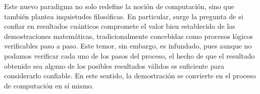 \documentclass[twoside, digital, 11pt]{fc-hw-template}
\begin{document}
Este nuevo paradigma no solo redefine la noción de computación, sino que también plantea inquietudes filosóficas. En particular, surge la pregunta de si confiar en resultados cuánticos compromete el valor bien establecido de las demostraciones matemáticas, tradicionalmente concebidas como procesos lógicos verificables paso a paso. Este temor, sin embargo, es infundado, pues aunque no podamos verificar cada uno de los pasos del proceso, el hecho de que el resultado obtenido sea alguno de los posibles resultados válidos es suficiente para considerarlo confiable. En este sentido, la demostración se convierte en el proceso de computación en sí mismo.
\printbibliography
\end{document}
